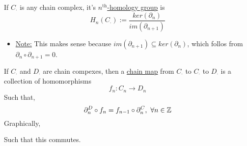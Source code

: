 \documentclass[../notes.tex]{subfiles}
\begin{document}
\begin{definition}
    If $C_{\cdot}$ is any chain complex, it's \underline{$n^{\text{th}}$-homology group} is
    \[
        H_n(C_{\cdot}):=\frac{ker(\partial_n)}{im(\partial_{n+1})}
    \]
\end{definition}
\begin{itemize}
    \item \underline{Note:} This makes sense because $im(\partial_{n+1})\subseteq ker
        (\partial_n)$, which follos from $\partial_n\circ\partial_{n+1}=0$.
\end{itemize}
\begin{definition}
    If $C_{\cdot}$ and $D_{\cdot}$ are chain compexes, then a \underline{chain map} from
    $C_{\cdot}$ to $C_{\cdot}$ to $D_{\cdot}$ is a collection of homomorphisms
    \[
        f_n:C_n\rightarrow D_n
    \]
    Such that,
    \[
        \partial_n^D\circ f_n=f_{n-1}\circ\partial_n^C,\ \forall n\in \mathbb{Z}
    \]
    \newpage
    Graphically,
    \begin{center}
    \end{center}
    Such that this commutes.
\end{definition}
\end{document}
